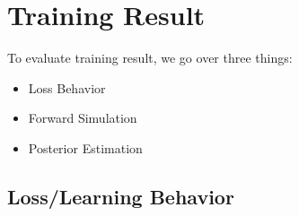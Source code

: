 \documentclass[
]{article}
\providecommand{\tightlist}{%
  \setlength{\itemsep}{0pt}\setlength{\parskip}{0pt}}\usepackage{longtable,booktabs,array}
\begin{document}
\section{Training Result}\label{training-result}

To evaluate training result, we go over three things:

\begin{itemize}
\tightlist
\item
  Loss Behavior
\item
  Forward Simulation
\item
  Posterior Estimation
\end{itemize}

\subsection{Loss/Learning Behavior}\label{losslearning-behavior}
\end{document}
